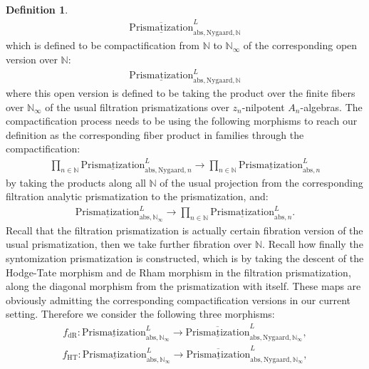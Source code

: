 \documentclass[12pt]{article}
\theoremstyle{definition}
\newtheorem{definition}{Definition}
\begin{document}
\begin{definition}
\begin{align}
\overline{\underline{\mathrm{Prismatization}}}^L_{\mathrm{abs},\mathrm{Nygaard},\mathbb{N}}
\end{align}
which is defined to be compactification from $\mathbb{N}$ to $\mathbb{N}_\infty$ of the corresponding open version over $\mathbb{N}$:
\begin{align}
{\underline{\mathrm{Prismatization}}}^L_{\mathrm{abs},\mathrm{Nygaard},\mathbb{N}}
\end{align}
where this open version is defined to be taking the product over the finite fibers over $\mathbb{N}_\infty$ of the usual filtration prismatizations over $z_n$-nilpotent $A_n$-algebras. The compactification process needs to be using the following morphisms to reach our definition as the corresponding fiber product in families through the compactification:
\begin{align}
\prod_{n\in \mathbb{N}} {\underline{\mathrm{Prismatization}}}^L_{\mathrm{abs},\mathrm{Nygaard},n}\rightarrow  \prod_{n\in \mathbb{N}} {\underline{\mathrm{Prismatization}}}^L_{\mathrm{abs},n}
\end{align}
by taking the products along all $\mathbb{N}$ of the usual projection from the corresponding filtration analytic prismatization to the prismatization, and:
\begin{align}
{\underline{\mathrm{Prismatization}}}^L_{\mathrm{abs},\mathbb{N}_\infty}\rightarrow  \prod_{n\in \mathbb{N}} {\underline{\mathrm{Prismatization}}}^L_{\mathrm{abs},n}.
\end{align}
Recall that the filtration prismatization is actually certain fibration version of the usual prismatization, then we take further fibration over $\mathbb{N}$. Recall how finally the syntomization prismatization is constructed, which is by taking the descent of the Hodge-Tate morphism and de Rham morphism in the filtration prismatization, along the diagonal morphism from the prismatization with itself. These maps are obviously admitting the corresponding compactification versions in our current setting. Therefore we consider the following three morphisms:
\begin{align}
f_\mathrm{dR}: {\underline{\mathrm{Prismatization}}}^L_{\mathrm{abs},\mathbb{N}_\infty}\rightarrow \overline{\underline{\mathrm{Prismatization}}}^L_{\mathrm{abs},\mathrm{Nygaard},\mathbb{N}_\infty},
\end{align}
\begin{align}
f_\mathrm{HT}: {\underline{\mathrm{Prismatization}}}^L_{\mathrm{abs},\mathbb{N}_\infty}\rightarrow \overline{\underline{\mathrm{Prismatization}}}^L_{\mathrm{abs},\mathrm{Nygaard},\mathbb{N}_\infty},

\end{align}
\end{definition}
\end{document}

